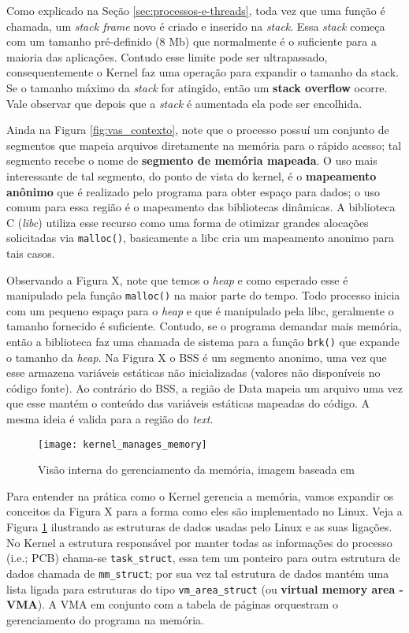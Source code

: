 Como explicado na Seção \ref{sec:processos-e-threads}, toda vez que uma função
é chamada, um \textit{stack frame} novo é criado e inserido na \textit{stack}.
Essa \textit{stack} começa com um tamanho pré-definido (8 Mb) que normalmente é
o suficiente para a maioria das aplicações. Contudo esse limite pode ser
ultrapassado, consequentemente o Kernel faz uma operação para expandir o
tamanho da stack. Se o tamanho máximo da \textit{stack} for atingido, então um
\textbf{stack overflow} ocorre. Vale observar que depois que a \textit{stack} é
aumentada ela pode ser encolhida.

Ainda na Figura \ref{fig:vas_contexto}, note que o processo possuí um conjunto
de segmentos que mapeia arquivos diretamente na memória para o rápido acesso;
tal segmento recebe o nome de \textbf{segmento de memória mapeada}. O uso mais
interessante de tal segmento, do ponto de vista do kernel, é o
\textbf{mapeamento anônimo} que é realizado pelo programa para obter espaço
para dados; o uso comum para essa região é o mapeamento das bibliotecas
dinâmicas. A biblioteca C (\textit{libc}) utiliza esse recurso como uma forma
de otimizar grandes alocações solicitadas via \texttt{malloc()}, basicamente a
libc cria um mapeamento anonimo para tais casos.

Observando a Figura X, note que temos o \textit{heap} e como esperado esse é
manipulado pela função \texttt{malloc()} na maior parte do tempo. Todo processo
inicia com um pequeno espaço para o \textit{heap} e que é manipulado pela libc,
geralmente o tamanho fornecido é suficiente. Contudo, se o programa demandar
mais memória, então a biblioteca faz uma chamada de sistema para a função
\texttt{brk()} que expande o tamanho da \textit{heap}. Na Figura X o BSS é um
segmento anonimo, uma vez que esse armazena variáveis estáticas não
inicializadas (valores não disponíveis no código fonte). Ao contrário do BSS, a
região de Data mapeia um arquivo uma vez que esse mantém o conteúdo das
variáveis estáticas mapeadas do código. A mesma ideia é valida para a região do
\textit{text}.

\begin{figure}[!h]
  \centering
  \texttt{[image: kernel\_manages\_memory]}
  \caption{Visão interna do gerenciamento da memória, imagem baseada em \citep{kernel_manages_memory}}
  \label{fig:kernel_manages_memory}
\end{figure}

Para entender na prática como o Kernel gerencia a memória, vamos expandir os
conceitos da Figura X para a forma como eles são implementado no Linux. Veja a
Figura \ref{fig:kernel_manages_memory} ilustrando as estruturas de dados usadas
pelo Linux e as suas ligações. No Kernel a estrutura responsável por manter
todas as informações do processo (i.e.; PCB) chama-se \texttt{task\_struct},
essa tem um ponteiro para outra estrutura de dados chamada de
\texttt{mm\_struct}; por sua vez tal estrutura de dados mantém uma lista ligada
para estruturas do tipo \texttt{vm\_area\_struct} (ou \textbf{virtual memory
area - VMA}). A VMA em conjunto com a tabela de páginas orquestram o
gerenciamento do programa na memória.

